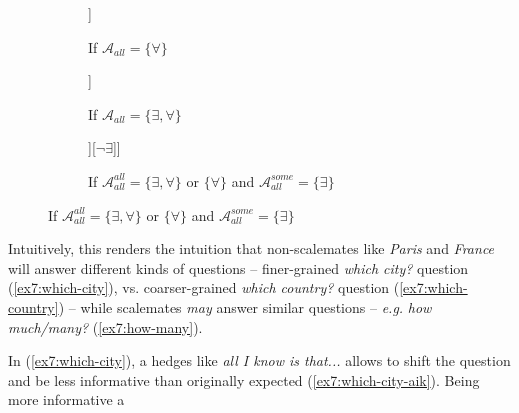 \begin{figure}[H]
	\centering
	\begin{subfigure}[b]{.2\linewidth}
		\centering
		\begin{forest}
			[CS[$\forall$][$\neg\forall$]]
		\end{forest}
		\caption{If $\mathcal{A}_{\textit{all}} = \lbrace\forall\rbrace$}
	\end{subfigure}
	\hfill
	\begin{subfigure}[b]{.3\linewidth}
		\centering
		\begin{forest}
			[CS[$\neg\exists$][\sbna][$\forall$]]
		\end{forest}
		\caption{If $\mathcal{A}_{\textit{all}} = \lbrace \exists, \forall\rbrace$}
	\end{subfigure}
	\hfill
	\begin{subfigure}[b]{.3\linewidth}
		\centering
		\begin{forest}
			[CS[$\exists$[$\forall$][\sbna]][$\neg\exists$]]
		\end{forest}
		\caption{If $\mathcal{A}_{\textit{all}}^{\textit{all}} = \lbrace \exists, \forall\rbrace$ or $\lbrace\forall\rbrace$  and $\mathcal{A}_{\textit{all}}^{\textit{some}} = \lbrace \exists\rbrace$}
	\end{subfigure}
\end{figure}







Intuitively, this renders the intuition that non-scalemates like \textit{Paris} and \textit{France} will answer different kinds of questions -- finer-grained \textit{which city?} question (\ref{ex7:which-city}), vs. coarser-grained \textit{which country?} question (\ref{ex7:which-country}) -- while scalemates \textit{may} answer similar questions -- \textit{e.g.} \textit{how much/many?} (\ref{ex7:how-many}).





In (\ref{ex7:which-city}), a hedges like \textit{all I know is that...} allows to shift the question and be less informative than originally expected (\ref{ex7:which-city-aik}). Being more informative a

